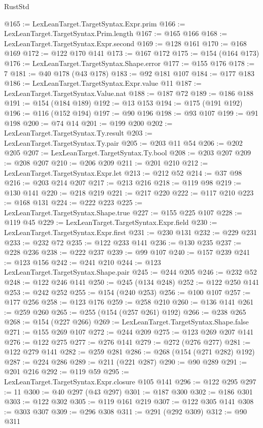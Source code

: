 \begin{lexlean}{RustStd}
\begin{coremodule}
@165 := LexLeanTarget.TargetSyntax.Expr.prim
@166 := LexLeanTarget.TargetSyntax.Prim.length
@167 := @165 @166
@168 := LexLeanTarget.TargetSyntax.Expr.second
@169 := @128 @161
@170 := @168 @169
@172 := @122 @170 @141
@173 := @167 @172
@175 := @154 (@164 @173)
@176 := LexLeanTarget.TargetSyntax.Shape.error
@177 := @155 @176
@178 := 7
@181 := @40 @178 (@43 @178)
@183 := @92 @181 @107
@184 := @177 @183
@186 := LexLeanTarget.TargetSyntax.Expr.value @11
@187 := LexLeanTarget.TargetSyntax.Value.nat
@188 := @187 @72
@189 := @186 @188
@191 := @154 (@184 @189)
@192 := @13 @153
@194 := @175 (@191 @192)
@196 := @116 (@152 @194)
@197 := @90 @196
@198 := @93 @107
@199 := @91 @198
@200 := @74 @14
@201 := @199 @200
@202 := LexLeanTarget.TargetSyntax.Ty.result
@203 := LexLeanTarget.TargetSyntax.Ty.pair
@205 := @203 @11 @54
@206 := @202 @205
@207 := LexLeanTarget.TargetSyntax.Ty.bool
@208 := @203 @207
@209 := @208 @207
@210 := @206 @209
@211 := @201 @210
@212 := LexLeanTarget.TargetSyntax.Expr.let
@213 := @212 @52
@214 := @37 @98
@216 := @203 @214 @207
@217 := @213 @216
@218 := @119 @98
@219 := @130 @141
@220 := @218 @219
@221 := @217 @220
@222 := @117 @210
@223 := @168 @131
@224 := @222 @223
@225 := LexLeanTarget.TargetSyntax.Shape.true
@227 := @155 @225 @107
@228 := @119 @45
@229 := LexLeanTarget.TargetSyntax.Expr.field
@230 := LexLeanTarget.TargetSyntax.Expr.first
@231 := @230 @131
@232 := @229 @231
@233 := @232 @72
@235 := @122 @233 @141
@236 := @130 @235
@237 := @228 @236
@238 := @222 @237
@239 := @99 @107
@240 := @157 @239
@241 := @123 @156
@242 := @241 @210
@244 := @123 LexLeanTarget.TargetSyntax.Shape.pair
@245 := @244 @205
@246 := @232 @52
@248 := @122 @246 @141
@250 := @245 (@134 @248)
@252 := @122 @250 @141
@253 := @242 @252
@255 := @154 (@240 @253)
@256 := @100 @107
@257 := @177 @256
@258 := @123 @176
@259 := @258 @210
@260 := @136 @141
@261 := @259 @260
@265 := @255 (@154 (@257 @261) @192)
@266 := @238 @265
@268 := @154 (@227 @266)
@269 := LexLeanTarget.TargetSyntax.Shape.false
@271 := @155 @269 @107
@272 := @244 @209
@275 := @123 @269 @207 @141
@276 := @122 @275
@277 := @276 @141
@279 := @272 (@276 @277)
@281 := @122 @279 @141
@282 := @259 @281
@286 := @268 (@154 (@271 @282) @192)
@287 := @224 @286
@289 := @211 (@221 @287)
@290 := @90 @289
@291 := @201 @216
@292 := @119 @59
@295 := LexLeanTarget.TargetSyntax.Expr.closure @105 @141
@296 := @122 @295
@297 := 11
@300 := @40 @297 (@43 @297)
@301 := @187 @300
@302 := @186 @301
@303 := @122 @302
@305 := @119 @161 @219
@307 := @122 @305 @141
@308 := @303 @307
@309 := @296 @308
@311 := @291 (@292 @309)
@312 := @90 @311

\end{coremodule}
\end{lexlean}
